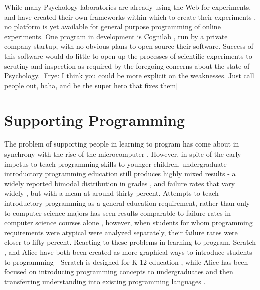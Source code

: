 \documentclass[12pt,a4paper,titlepage]{scrreprt}
\begin{document}
While many Psychology laboratories are already using the Web for experiments, and have created their own frameworks within which to create their experiments \parencite{krantz_comparing_1997,germine_is_2012}, no platform is yet available for general purpose programming of online experiments. One program in development is Cognilab \parencite{_cognilab_????}, run by a private company startup, with no obvious plans to open source their software. Success of this software would do little to open up the processes of scientific experiments to scrutiny and inspection as required by the foregoing concerns about the state of Psychology.
[Frye: I think you could be more explicit on the weaknesses. Just call people out, haha, and be the super hero that fixes them]
\section{Supporting Programming}
The problem of supporting people in learning to program has come about in synchrony with the rise of the microcomputer \parencite{papert_teaching_1971,papert_teaching_1971_1,papert_computer_1971,papert_twenty_1971,papert_making_1972}. However, in spite of the early impetus to teach programming skills to younger children, undergraduate introductory programming education still produces highly mixed results - a widely reported bimodal distribution in grades \parencite{dehnadi_camel_2006} \parencite{robins_learning_2010}, and failure rates that vary widely \parencite{bennedsen_failure_2007}, but with a mean at around thirty percent. Attempts to teach introductory programming as a general education requirement, rather than only to computer science majors has seen results comparable to failure rates in computer science courses alone \parencite{guzdial_education:_2009}, however, when students for whom programming requirements were atypical were analyzed separately, their failure rates were closer to fifty percent. Reacting to these problems in learning to program, Scratch \parencite{maloney_scratch:_2004}, and Alice \parencite{moskal_evaluating_2004} have both been created as more graphical ways to introduce students to programming - Scratch is designed for K-12 education \parencite{malan_scratch_2007}, while Alice has been focused on introducing programming concepts to undergraduates and then transferring understanding into existing programming languages \parencite{dann_mediated_2012}.
\end{document}
